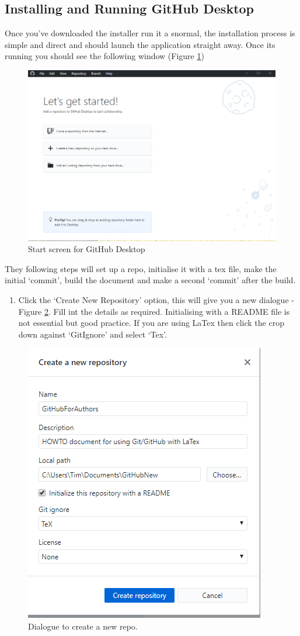 \documentclass[a4paper, 12pt]{article}
\begin{document}
\subsection{Installing and Running GitHub Desktop}
Once you've downloaded the installer run it a snormal, the installation process is simple and direct and should launch the application straight away. Once its running you should see the following window (Figure \ref{startscreen})
\begin{figure}
\centering
\includegraphics[width=\linewidth]{startscreen}
\caption{Start screen for GitHub Desktop}
\label{startscreen}
\end{figure}
They following steps will set up a repo, initialise it with a tex file, make the initial `commit', build the document and make a second `commit' after the build.
\begin{enumerate}
\item Click the `Create New Repository' option, this will give you a new dialogue - Figure \ref{newrepo}. Fill int the details as required. Initialising with a README file is not essential but good practice. If you are using LaTex then click the crop down against `GitIgnore' and select `Tex'.
\end{enumerate}
\begin{figure}
\centering
\includegraphics{NewRepo}
\caption{Dialogue to create a new repo.}
\label{newrepo}
\end{figure}
\end{document}
